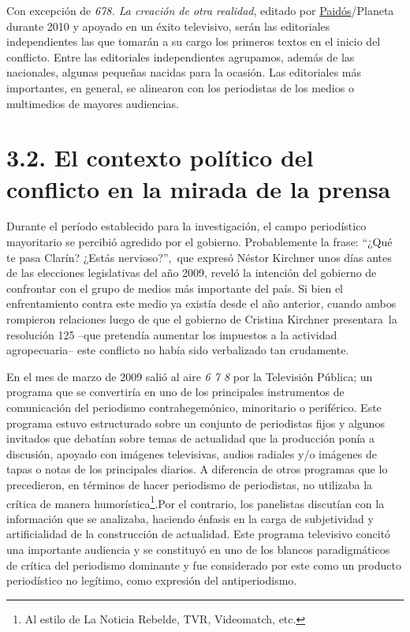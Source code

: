 {Con excepción de \emph{678. La creación de otra realidad}, editado por \href{http://www.lecturalia.com/editoriales/79/paidos}{Paidós}/Planeta durante 2010 y apoyado en un éxito televisivo, serán las editoriales independientes las que tomarán a su cargo los primeros textos en el inicio del conflicto. Entre las editoriales independientes agrupamos, además de las nacionales, algunas pequeñas nacidas para la ocasión. Las editoriales más importantes, en general, se alinearon con los periodistas de los medios o multimedios de mayores audiencias.

\section{3.2. El contexto político del conflicto en la mirada de la prensa}

Durante el período establecido para la investigación, el campo periodístico mayoritario se percibió agredido por el gobierno. Probablemente la frase: \enquote{¿Qué te pasa Clarín? ¿Estás nervioso?},~que expresó Néstor Kirchner unos días antes de las elecciones legislativas del año 2009, reveló la intención del gobierno de confrontar con el grupo de medios más importante del país. Si bien el enfrentamiento contra este medio ya existía desde el año anterior, cuando ambos rompieron relaciones luego de que el gobierno de Cristina Kirchner presentara~la resolución 125 --que pretendía aumentar los impuestos a la actividad agropecuaria-- este conflicto no había sido verbalizado tan crudamente.

En el mes de marzo de 2009 salió al aire \emph{6 7 8} por la Televisión Pública; un programa que se convertiría en uno de los principales instrumentos de comunicación del periodismo contrahegemónico, minoritario o periférico. Este programa estuvo estructurado sobre un conjunto de periodistas fijos y algunos invitados que debatían sobre temas de actualidad que la producción ponía a discusión, apoyado con imágenes televisivas, audios radiales y/o imágenes de tapas o notas de los principales diarios. A diferencia de otros programas que lo precedieron, en términos de hacer periodismo de periodistas, no utilizaba la crítica de manera humorística\footnote{Al estilo de La Noticia Rebelde, TVR, Videomatch, etc.}.Por el contrario, los panelistas discutían con la información que se analizaba, haciendo énfasis en la carga de subjetividad y artificialidad de la construcción de actualidad. Este programa televisivo concitó una importante audiencia y se constituyó en uno de los blancos paradigmáticos de crítica del periodismo dominante y fue considerado por este como un producto periodístico no legítimo, como expresión del antiperiodismo.

}
